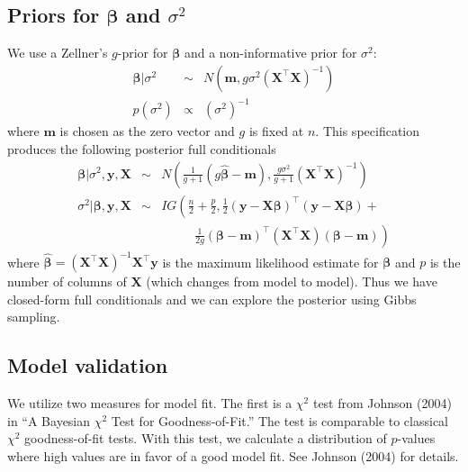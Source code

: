 \documentclass{asaproc}
\newcommand{\m}[1]{\mathbf{\bm{#1}}}
\begin{document}

\subsection{Priors for $\m{\beta}$ and $\sigma^2$}

We use a Zellner's $g$-prior for $\m{\beta}$ and a non-informative prior for $\sigma^2$:
\begin{eqnarray*}
\m{\beta}|\sigma^2 &\sim& N(\m{m}, g\sigma^2(\m{X}^\top\m{X})^{-1}) \\
p(\sigma^2) &\propto& (\sigma^2)^{-1}
\end{eqnarray*}
where $\m{m}$ is chosen as the zero vector and $g$ is fixed at $n$. This specification produces the following posterior full conditionals
\begin{eqnarray*}
\m{\beta}|\sigma^2, \m{y}, \m{X} &\sim& N\left(\frac{1}{g+1}(g\hat{\m{\beta}}-\m{m}), \frac{g\sigma^2}{g+1}(\m{X}^\top\m{X})^{-1}\right) \\
\sigma^2|\m{\beta}, \m{y}, \m{X} &\sim& IG\left(\frac{n}{2}+\frac{p}{2}, \frac{1}{2}(\m{y}-\m{X}\m{\beta})^\top(\m{y}-\m{X}\m{\beta})\right.+ \\
& & ~~~~ ~~~~ ~~~~ \left.\frac{1}{2g}(\m{\beta}-\m{m})^\top(\m{X}^\top\m{X})(\m{\beta}-\m{m})\right)
\end{eqnarray*}
where $\hat{\m{\beta}}=(\m{X}^\top\m{X})^{-1}\m{X}^\top\m{y}$ is the maximum likelihood estimate for $\m{\beta}$ and $p$ is the number of columns of $\m{X}$ (which changes from model to model). Thus we have closed-form full conditionals and we can explore the posterior using Gibbs sampling.

\subsection{Model validation}

We utilize two measures for model fit. The first is a $\chi^2$ test from Johnson (2004) in ``A Bayesian $\chi^2$ Test for Goodness-of-Fit.'' The test is comparable to classical $\chi^2$ goodness-of-fit tests. With this test, we calculate a distribution of $p$-values where high values are in favor of a good model fit. See Johnson (2004) for details.
\end{document}
